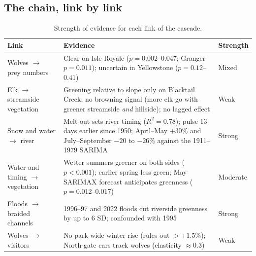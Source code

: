 \documentclass[11pt,a4paper]{article}
\begin{document}
\subsection{The chain, link by link}
\begin{table}[H]
\centering\small
\caption{Strength of evidence for each link of the cascade.}\label{tab:chain}
\begin{tabularx}{\textwidth}{@{}l Y l@{}}
\toprule
Link & Evidence & Strength \\
\midrule
Wolves $\rightarrow$ prey numbers & Clear on Isle Royale ($p=0.002$--$0.047$; Granger $p=0.011$); uncertain in Yellowstone ($p=0.12$--$0.41$) & Mixed \\
Elk $\rightarrow$ streamside vegetation & Greening relative to slope only on Blacktail Creek; no browning signal (more elk go with greener streamside \emph{and} hillside); no lagged effect & Weak \\
Snow and water $\rightarrow$ river & Melt-out sets river timing ($R^2=0.78$); pulse 13 days earlier since 1950; April--May $+30\%$ and July--September $-20$ to $-26\%$ against the 1911--1979 SARIMA & Strong \\
Water and timing $\rightarrow$ vegetation & Wetter summers greener on both sides ($p<0.001$); earlier spring less green; May SARIMAX forecast anticipates greenness ($p=0.012$--$0.017$) & Moderate \\
Floods $\rightarrow$ braided channels & 1996--97 and 2022 floods cut riverside greenness by up to 6 SD; confounded with 1995 & Strong \\
Wolves $\rightarrow$ visitors & No park-wide winter rise (rules out $>+1.5\%$); North-gate cars track wolves (elasticity $\approx0.3$) & Weak \\
\bottomrule
\end{tabularx}
\end{table}

\end{document}
